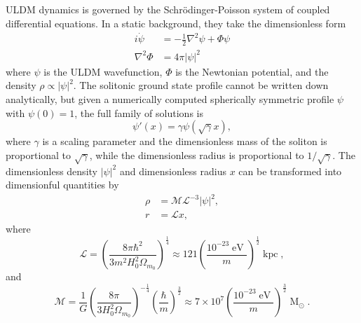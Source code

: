 \documentclass[a4paper,11pt]{article}
\begin{document}
ULDM dynamics is governed by the Schr{\"o}dinger-Poisson system of coupled differential equations. In a static background, they take the dimensionless form  
%
\begin{align}
    i\dot{\psi} &= -\frac{1}{2}\nabla^2\psi+\Phi\psi \\
    \nabla^2\Phi &= 4\pi \vert \psi\vert^2
\end{align}
%
where $\psi$ is the ULDM wavefunction, $\Phi$ is the Newtonian potential, and the density $\rho \propto |\psi|^2$. The solitonic ground state profile cannot be written down analytically, but given a numerically computed spherically symmetric  profile $\psi$ with $\psi(0)=1$, the full family of solutions is
%
\begin{equation}
    \psi'(x) = \gamma\psi(\sqrt{\gamma}x),
\end{equation}
%
where $\gamma$ is a scaling parameter and the dimensionless mass of the soliton is proportional to $\sqrt{\gamma}$, while the dimensionless radius is proportional to $1/\sqrt{\gamma}$. The dimensionless density $\vert\psi\vert^2$ and dimensionless radius $x$ can be transformed into dimensionful quantities by
\begin{align}
    \rho &= \mathcal{M}\mathcal{L}^{-3}\vert\psi\vert^2, \label{eq:density_conv} \\
    r &= \mathcal{L}x, \label{eq:mass_conv}
\end{align}
where
\begin{equation}\label{eq:length}
    \mathcal{L}=\left(\frac{8\pi\hbar^2}{3 m^2H_0^2\Omega_{m_0}}\right)^{\frac{1}{4}}\approx121\left(\frac{10^{-23}\operatorname{eV}}{m}\right)^{\frac{1}{2}}\operatorname{kpc},
\end{equation}
%
and 
%
\begin{equation}\label{eq:mass}
    \mathcal{M}=\frac{1}{G}\left(\frac{8\pi}{3 H_0^2\Omega_{m_0}}\right)^{-\frac{1}{4}}\left(\frac{\hbar}{m}\right)^{\frac{3}{2}}\approx 7\times 10^7\left(\frac{10^{-23}\operatorname{eV}}{m}\right)^{\frac{3}{2}}\operatorname{M}_{\odot}.
\end{equation}

\
\end{document}
